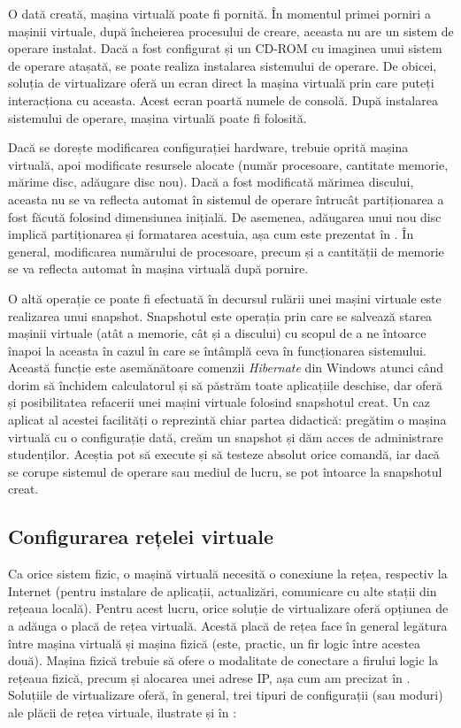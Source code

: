 O dată creată, mașina virtuală poate fi pornită.
În momentul primei porniri a mașinii virtuale, după încheierea
procesului de creare, aceasta nu are un sistem de operare instalat.
Dacă a fost configurat și un CD-ROM cu imaginea unui sistem de operare
atașată, se poate
realiza instalarea sistemului de operare. De obicei, soluția de virtualizare
oferă un ecran direct la mașina virtuală prin care puteți interacționa cu
aceasta. Acest ecran poartă numele de consolă. După instalarea
sistemului de operare, mașina virtuală poate fi folosită.

Dacă se dorește modificarea configurației hardware, trebuie
oprită mașina
virtuală, apoi modificate resursele alocate (număr procesoare, cantitate memorie,
mărime disc, adăugare disc nou). Dacă a fost modificată mărimea discului,
aceasta nu se va reflecta automat în sistemul de operare întrucât partiționarea
a fost făcută folosind dimensiunea inițială. De asemenea, adăugarea unui nou disc
implică partiționarea și formatarea acestuia, așa cum este prezentat în . În general, modificarea numărului
de procesoare, precum și a cantității de memorie se va reflecta automat în mașina
virtuală după pornire.

O altă operație ce poate fi efectuată în decursul rulării unei mașini virtuale
este realizarea unui snapshot. Snapshotul este operația prin care se salvează starea mașinii
virtuale (atât a memorie, cât și a discului) cu scopul de a ne întoarce înapoi la
aceasta în cazul în care se întâmplă ceva în funcționarea sistemului. Această
funcție este asemănătoare comenzii \textit{Hibernate} din Windows atunci când dorim să închidem
calculatorul și să păstrăm toate aplicațiile deschise, dar oferă și posibilitatea
refacerii unei mașini virtuale folosind snapshotul creat. Un caz aplicat al
acestei facilități o reprezintă chiar partea didactică: pregătim o mașina
virtuală cu o configurație dată, creăm un snapshot și dăm acces de administrare
studenților. Aceștia pot să execute și să testeze absolut orice comandă, iar dacă
se corupe sistemul de operare sau mediul de lucru, se pot întoarce la snapshotul creat.

\subsection{Configurarea rețelei virtuale}
\label{sec:vm:ops:net}

Ca orice sistem fizic, o mașină virtuală necesită o conexiune la rețea,
respectiv la Internet (pentru instalare de aplicații, actualizări, comunicare cu
alte stații din rețeaua locală). Pentru acest lucru, orice soluție de
virtualizare oferă opțiunea de a adăuga o placă de rețea virtuală. Acestă placă
de rețea face în general legătura între mașina virtuală și mașina fizică (este,
practic, un fir logic între acestea două). Mașina fizică trebuie să ofere o
modalitate de conectare a firului logic la rețeaua fizică, precum și alocarea
unei adrese IP, așa cum am precizat în . Soluțiile de
virtualizare oferă, în general, trei tipuri de configurații (sau moduri) ale
plăcii de rețea virtuale, ilustrate și în :

